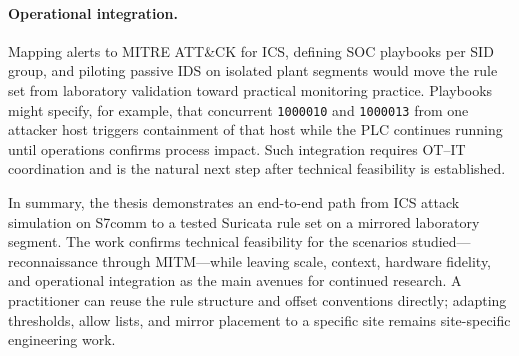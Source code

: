 \documentclass[../main.tex]{subfiles}
\begin{document}
\paragraph{Operational integration.}
Mapping alerts to MITRE ATT\&CK for ICS, defining SOC playbooks per SID group, and piloting passive IDS on isolated plant segments would move the rule set from laboratory validation toward practical monitoring practice. Playbooks might specify, for example, that concurrent \texttt{1000010} and \texttt{1000013} from one attacker host triggers containment of that host while the PLC continues running until operations confirms process impact. Such integration requires OT--IT coordination and is the natural next step after technical feasibility is established.

In summary, the thesis demonstrates an end-to-end path from ICS attack simulation on S7comm to a tested Suricata rule set on a mirrored laboratory segment. The work confirms technical feasibility for the scenarios studied---reconnaissance through MITM---while leaving scale, context, hardware fidelity, and operational integration as the main avenues for continued research. A practitioner can reuse the rule structure and offset conventions directly; adapting thresholds, allow lists, and mirror placement to a specific site remains site-specific engineering work.
\end{document}
